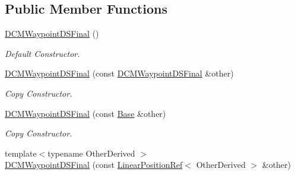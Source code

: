 \subsection*{Public Member Functions}
\begin{DoxyCompactItemize}
\item 
\hyperlink{classow__core_1_1DCMWaypointDSFinal_a52d34b77d8571ed2c3c354d292b94c71}{D\+C\+M\+Waypoint\+D\+S\+Final} ()\hypertarget{classow__core_1_1DCMWaypointDSFinal_a52d34b77d8571ed2c3c354d292b94c71}{}\label{classow__core_1_1DCMWaypointDSFinal_a52d34b77d8571ed2c3c354d292b94c71}

\begin{DoxyCompactList}\small\item\em Default Constructor. \end{DoxyCompactList}\item 
\hyperlink{classow__core_1_1DCMWaypointDSFinal_ac40bd8ca538880a9da9ffdebef25bfd7}{D\+C\+M\+Waypoint\+D\+S\+Final} (const \hyperlink{classow__core_1_1DCMWaypointDSFinal}{D\+C\+M\+Waypoint\+D\+S\+Final} \&other)\hypertarget{classow__core_1_1DCMWaypointDSFinal_ac40bd8ca538880a9da9ffdebef25bfd7}{}\label{classow__core_1_1DCMWaypointDSFinal_ac40bd8ca538880a9da9ffdebef25bfd7}

\begin{DoxyCompactList}\small\item\em Copy Constructor. \end{DoxyCompactList}\item 
\hyperlink{classow__core_1_1DCMWaypointDSFinal_ae5a5a4113b9cd3158137ccde2c166a71}{D\+C\+M\+Waypoint\+D\+S\+Final} (const \hyperlink{classow__core_1_1LinearPosition}{Base} \&other)\hypertarget{classow__core_1_1DCMWaypointDSFinal_ae5a5a4113b9cd3158137ccde2c166a71}{}\label{classow__core_1_1DCMWaypointDSFinal_ae5a5a4113b9cd3158137ccde2c166a71}

\begin{DoxyCompactList}\small\item\em Copy Constructor. \end{DoxyCompactList}\item 
{\footnotesize template$<$typename Other\+Derived $>$ }\\\hyperlink{classow__core_1_1DCMWaypointDSFinal_a9c2c24d137a47c4c7b684500c4783ef6}{D\+C\+M\+Waypoint\+D\+S\+Final} (const \hyperlink{classow__core_1_1LinearPositionRef}{Linear\+Position\+Ref}$<$ Other\+Derived $>$ \&other)\hypertarget{classow__core_1_1DCMWaypointDSFinal_a9c2c24d137a47c4c7b684500c4783ef6}{}\label{classow__core_1_1DCMWaypointDSFinal_a9c2c24d137a47c4c7b684500c4783ef6}


\end{DoxyCompactItemize}
